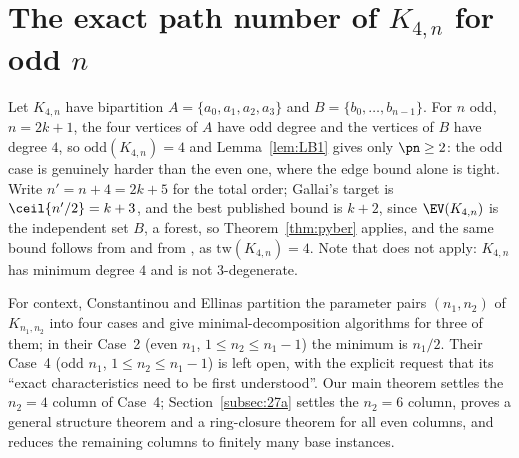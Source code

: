 \section{The exact path number of \texorpdfstring{$K_{4,n}$}{K(4,n)} for odd
\texorpdfstring{$n$}{n}}\label{sec:k4odd}

Let $K_{4,n}$ have bipartition $A=\{a_0,a_1,a_2,a_3\}$ and $B=\{b_0,\dots,b_{n-1}\}$.
For $n$ odd, $n=2k+1$, the four vertices of $A$ have odd degree and the vertices of $B$ have
degree $4$, so $\mathrm{odd}(K_{4,n})=4$ and Lemma~\ref{lem:LB1} gives only $\pn\ge2$: the odd
case is genuinely harder than the even one, where the edge bound alone is tight. Write
$n'=n+4=2k+5$ for the total order; Gallai's target is $\ceil{n'/2}=k+3$, and the best published
bound is $k+2$, since $\EV(K_{4,n})$ is the independent set $B$, a forest, so
Theorem~\ref{thm:pyber} applies, and the same bound follows from \cite{Fan05} and from
\cite{LY24}, as $\mathrm{tw}(K_{4,n})=4$. Note that \cite{ZLH24} does not apply:
$K_{4,n}$ has minimum degree $4$ and is not $3$-degenerate.

For context, Constantinou and Ellinas \cite{CE18} partition the parameter pairs $(n_1,n_2)$ of
$K_{n_1,n_2}$ into four cases and give minimal-decomposition algorithms for three of them; in
their Case~2 (even $n_1$, $1\le n_2\le n_1-1$) the minimum is $n_1/2$. Their Case~4 (odd $n_1$,
$1\le n_2\le n_1-1$) is left open, with the explicit request that its ``exact characteristics
need to be first understood''. Our main theorem settles the $n_2=4$ column of Case~4;
Section~\ref{subsec:27a} settles the $n_2=6$ column, proves a general structure theorem and a
ring-closure theorem for all even columns, and reduces the remaining columns to finitely many
base instances.

